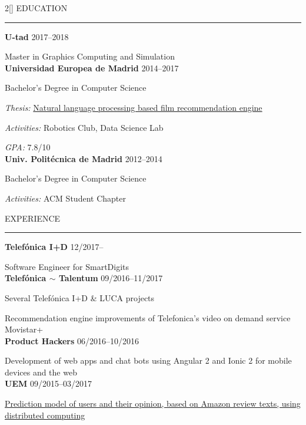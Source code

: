 \documentclass[a4paper, 12pt]{article}
\newenvironment{myparacol}[2][]{%
\begin{paracol}{#2}[#1]\setlength{\parindent}{0pt}}{%
\end{paracol}}
\begin{document}
\setlength{\columnsep}{24pt}
\begin{sloppypar}
\begin{myparacol}{2}
    EDUCATION
    \vspace{1mm}
    \hrule
    \kern9pt
    \textbf{U-tad} \hfill 2017--2018

    Master in Graphics Computing and Simulation\\

    \textbf{Universidad Europea de Madrid} \hfill 2014--2017

    Bachelor's Degree in Computer Science

    \textit{Thesis:} \href{https://github.com/hugo19941994/movie-pepper-doc/raw/master/thesis.pdf}{Natural language processing based film recommendation engine}

    \textit{Activities:} Robotics Club, Data Science Lab

    \textit{GPA:} 7.8/10\\

    \textbf{Univ. Politécnica de Madrid} \hfill 2012--2014

    Bachelor's Degree in Computer Science

    \textit{Activities:} ACM Student Chapter
    \\

    \switchcolumn{}

    EXPERIENCE
    \vspace{1mm}
    \hrule
    \kern9pt

    \textbf{Telefónica I+D} \hfill 12/2017--

    Software Engineer for SmartDigits\\

    \textbf{Telefónica $\sim$ Talentum} \hfill 09/2016--11/2017

    Several Telefónica I+D \& LUCA projects

    Recommendation engine improvements of Telefonica's video on demand service Movistar+\\

    \textbf{Product Hackers} \hfill 06/2016--10/2016

    Development of web apps and chat bots using Angular 2 and Ionic 2 for mobile devices and the web\\

    \textbf{UEM} \hfill 09/2015--03/2017

    \href{https://www.researchgate.net/publication/314142014_Prediction_of_User_Opinion_for_Products_-_A_Bag-of-Words_and_Collaborative_Filtering_based_Approach}{Prediction model of users and their opinion, based on Amazon review texts, using distributed computing}


\end{myparacol}
\end{sloppypar}
\end{document}
